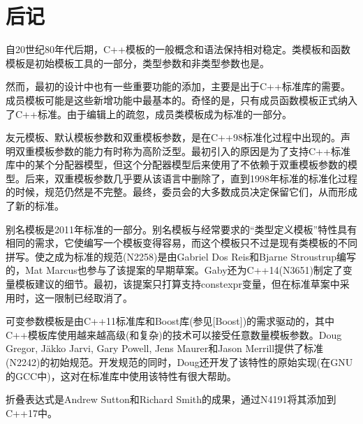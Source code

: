 \section{后记}
自20世纪80年代后期，C++模板的一般概念和语法保持相对稳定。类模板和函数模板是初始模板工具的一部分，类型参数和非类型参数也是。

然而，最初的设计中也有一些重要功能的添加，主要是出于C++标准库的需要。成员模板可能是这些新增功能中最基本的。奇怪的是，只有成员函数模板正式纳入了C++标准。由于编辑上的疏忽，成员类模板成为标准的一部分。

友元模板、默认模板参数和双重模板参数，是在C++98标准化过程中出现的。声明双重模板参数的能力有时称为高阶泛型。最初引入的原因是为了支持C++标准库中的某个分配器模型，但这个分配器模型后来使用了不依赖于双重模板参数的模型。后来，双重模板参数几乎要从该语言中删除了，直到1998年标准的标准化过程的时候，规范仍然是不完整。最终，委员会的大多数成员决定保留它们，从而形成了新的标准。

别名模板是2011年标准的一部分。别名模板与经常要求的“类型定义模板”特性具有相同的需求，它使编写一个模板变得容易，而这个模板只不过是现有类模板的不同拼写。使之成为标准的规范(N2258)是由Gabriel Dos Reis和Bjarne Stroustrup编写的，Mat Marcus也参与了该提案的早期草案。Gaby还为C++14(N3651)制定了变量模板建议的细节。最初，该提案只打算支持constexpr变量，但在标准草案中采用时，这一限制已经取消了。

可变参数模板是由C++11标准库和Boost库(参见[Boost])的需求驱动的，其中C++模板库使用越来越高级(和复杂)的技术可以接受任意数量模板参数。Doug Gregor, J{\"a}kko Jarvi, Gary Powell, Jens Maurer和Jason Merrill提供了标准(N2242)的初始规范。开发规范的同时，Doug还开发了该特性的原始实现(在GNU的GCC中)，这对在标准库中使用该特性有很大帮助。

折叠表达式是Andrew Sutton和Richard Smith的成果，通过N4191将其添加到C++17中。










